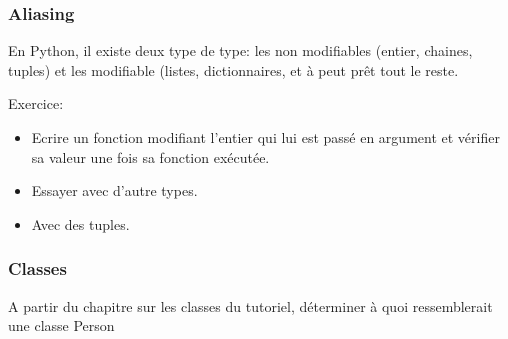 \documentclass{beamer}
\begin{document}
\begin{frame}\frametitle{Aliasing}
  En Python, il existe deux type de type: les non modifiables (entier, chaines, tuples) et les modifiable (listes, dictionnaires, et à peut prêt tout le reste.
  
  Exercice: 
  \begin{itemize}
  \item Ecrire un fonction modifiant l'entier qui lui est passé en argument et vérifier sa valeur une fois sa fonction exécutée.
  \item Essayer avec d'autre types.
  \item Avec des tuples.
  \end{itemize}
\end{frame}

\begin{frame}\frametitle{Classes}
  A partir du chapitre sur les classes du tutoriel, déterminer à quoi ressemblerait une classe {\nf Person}
\end{frame}
\end{document}
